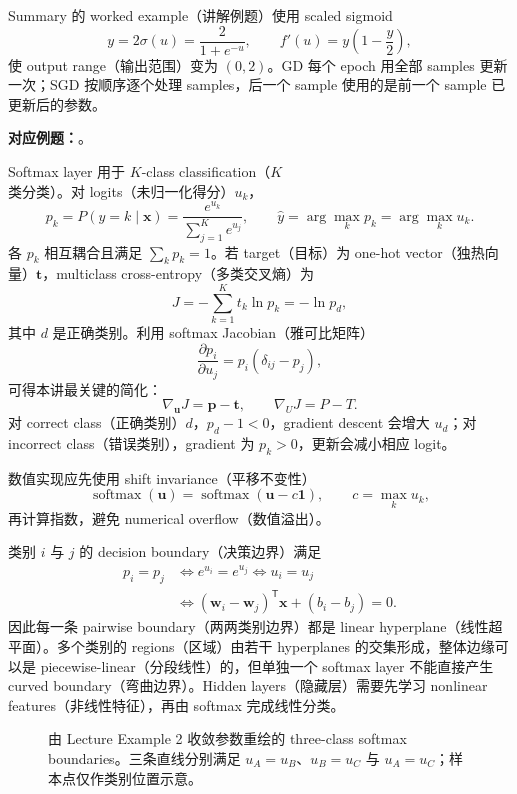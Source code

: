 Summary 的 worked example（讲解例题）使用 scaled sigmoid
\[
  y=2\sigma(u)=\frac{2}{1+e^{-u}},
  \qquad
  \boxed{f'(u)=y\left(1-\frac y2\right)},
\]
使 output range（输出范围）变为 $(0,2)$。GD 每个 epoch 用全部 samples 更新一次；SGD 按顺序逐个处理 samples，后一个 sample 使用的是前一个 sample 已更新后的参数。

\textbf{对应例题：}。


Softmax layer 用于 $K$-class classification（$K$ 类分类）。对 logits（未归一化得分）$u_k$，
\[
  \boxed{p_k=P(y=k\mid\bm x)
    =\frac{e^{u_k}}{\sum_{j=1}^{K}e^{u_j}}},
  \qquad
  \hat y=\arg\max_k p_k=\arg\max_k u_k.
\]
各 $p_k$ 相互耦合且满足 $\sum_kp_k=1$。若 target（目标）为 one-hot vector（独热向量）$\bm t$，multiclass cross-entropy（多类交叉熵）为
\[
  J=-\sum_{k=1}^{K}t_k\ln p_k=-\ln p_d,
\]
其中 $d$ 是正确类别。利用 softmax Jacobian（雅可比矩阵）
\[
  \frac{\partial p_i}{\partial u_j}=p_i(\delta_{ij}-p_j),
\]
可得本讲最关键的简化：
\[
  \boxed{\nabla_{\bm u}J=\bm p-\bm t},
  \qquad
  \boxed{\nabla_UJ=P-T}.
\]
对 correct class（正确类别）$d$，$p_d-1<0$，gradient descent 会增大 $u_d$；对 incorrect class（错误类别），gradient 为 $p_k>0$，更新会减小相应 logit。

数值实现应先使用 shift invariance（平移不变性）
\[
  \operatorname{softmax}(\bm u)
  =\operatorname{softmax}(\bm u-c\bm 1),
  \qquad c=\max_k u_k,
\]
再计算指数，避免 numerical overflow（数值溢出）。


类别 $i$ 与 $j$ 的 decision boundary（决策边界）满足
\begin{align*}
  p_i=p_j
  &\iff e^{u_i}=e^{u_j}
   \iff u_i=u_j\\
  &\iff
  \boxed{(\bm w_i-\bm w_j)^{\mathsf T}\bm x+(b_i-b_j)=0}.
\end{align*}
因此每一条 pairwise boundary（两两类别边界）都是 linear hyperplane（线性超平面）。多个类别的 regions（区域）由若干 hyperplanes 的交集形成，整体边缘可以是 piecewise-linear（分段线性）的，但单独一个 softmax layer 不能直接产生 curved boundary（弯曲边界）。Hidden layers（隐藏层）需要先学习 nonlinear features（非线性特征），再由 softmax 完成线性分类。

\begin{figure}[htbp]
  \centering
  \resizebox{0.70\textwidth}{!}{}
  \caption{由 Lecture Example 2 收敛参数重绘的 three-class softmax boundaries。三条直线分别满足 $u_A=u_B$、$u_B=u_C$ 与 $u_A=u_C$；样本点仅作类别位置示意。}
  \label{fig:sc4001-l03-softmax-boundaries}
\end{figure}

